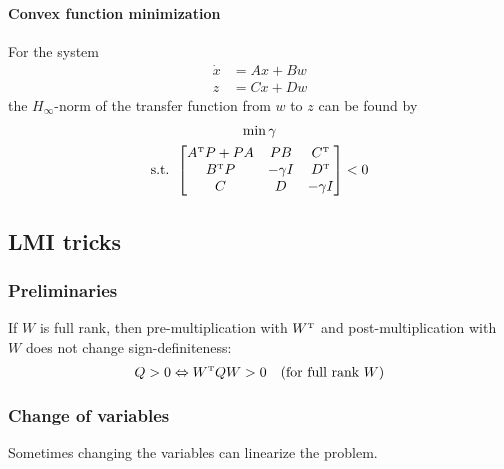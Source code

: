 \paragraph{Convex function minimization} For the system
%
\begin{equation}
  \begin{split}
    \dot{x} &= Ax + Bw \\
    z &= Cx + Dw
  \end{split}
\end{equation}
%
the $H_\infty$-norm of the transfer function from $w$ to $z$ can be found by
%
\begin{gather}
  \min \gamma \\
  \mbox{s.t. }
  \begin{bmatrix}
    A\tp P + PA & PB & C\tp \\
    B\tp P & -\gamma I & D\tp \\
    C & D & -\gamma I
  \end{bmatrix}
   < 0
\end{gather}

\subsection{LMI tricks}
\subsubsection{Preliminaries}
If $W$ is full rank, then pre-multiplication with $W\tp$ and post-multiplication with $W$ does not change sign-definiteness:
%
\begin{equation}\label{eq:pre-post-multiply}
  Q > 0 \Leftrightarrow W\tp Q W > 0 \quad (\mbox{for full rank } W)
\end{equation}

\subsubsection{Change of variables}\label{sssec:change-of-variables}
Sometimes changing the variables can linearize the problem.
